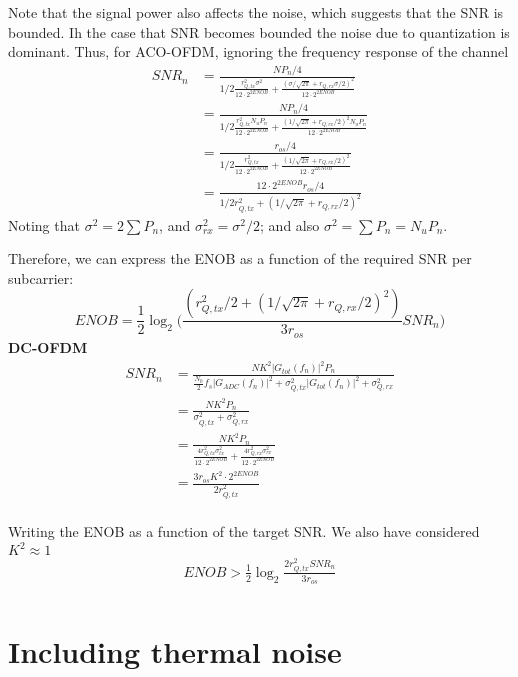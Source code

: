 \documentclass[a4paper]{article}
\begin{document}
Note that the signal power also affects the noise, which suggests that the SNR is bounded. Ih the case that SNR becomes bounded the noise due to quantization is dominant. Thus, for ACO-OFDM, ignoring the frequency response of the channel
\begin{align} \nonumber
SNR_n & = \frac{NP_n/4}{1/2\frac{r_{Q,tx}^2\sigma^2}{12\cdot 2^{2ENOB}} + \frac{(\sigma/\sqrt{2\pi} + r_{Q,rx}\sigma/2)^2}{12\cdot 2^{2ENOB}}} \\ \nonumber
& = \frac{NP_n/4}{1/2\frac{r_{Q,tx}^2N_uP_n}{12\cdot 2^{2ENOB}} + \frac{(1/\sqrt{2\pi} + r_{Q,rx}/2)^2N_uP_n}{12\cdot 2^{2ENOB}}} \\ \nonumber
& = \frac{r_{os}/4}{1/2\frac{r_{Q,tx}^2}{12\cdot 2^{2ENOB}} + \frac{(1/\sqrt{2\pi} + r_{Q,rx}/2)^2}{12\cdot 2^{2ENOB}}} \\
& = \frac{12\cdot 2^{2ENOB}r_{os}/4}{1/2r_{Q,tx}^2 + (1/\sqrt{2\pi} + r_{Q,rx}/2)^2}
\end{align}
Noting that $\sigma^2 = 2\sum P_n$, and $\sigma_{rx}^2 = \sigma^2/2$; and also $\sigma^2 = \sum P_n = N_uP_n$.

Therefore, we can express the ENOB as a function of the required SNR per subcarrier:
\begin{equation}
ENOB = \frac{1}{2}\log_2\bigg(\frac{(r_{Q,tx}^2/2 + (1/\sqrt{2\pi} + r_{Q,rx}/2)^2)}{3r_{os}}SNR_n\bigg)
\end{equation}
\textbf{DC-OFDM}
\begin{align} \nonumber
SNR_n & =  \frac{NK^2|G_{tot}(f_n)|^2P_n}{\frac{N_0}{2}f_s|G_{ADC}(f_n)|^2 + \sigma_{Q,tx}^2|G_{tot}(f_n)|^2 + \sigma_{Q,rx}^2} \\
& = \frac{NK^2P_n}{ \sigma_{Q,tx}^2 + \sigma_{Q,rx}^2} \\
&= \frac{NK^2P_n}{ \frac{4r_{Q,tx}^2\sigma_{tx}^2}{12\cdot 2^{2ENOB}} + \frac{4r_{Q,rx}^2\sigma_{rx}^2}{12\cdot 2^{2ENOB}}} \\
&= \frac{3r_{os}K^2 \cdot 2^{2ENOB}}{2r_{Q,tx}^2} \\
\end{align}

Writing the ENOB as a function of the target SNR. We also have considered $K^2 \approx 1$
\begin{align} \nonumber
ENOB > \frac{1}{2}\log_2\frac{2r_{Q,tx}^2SNR_n}{3r_{os}}  \\
\end{align}

\section{Including thermal noise}
\end{document}
